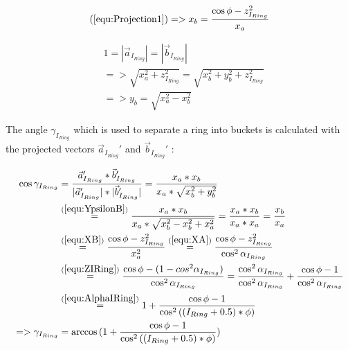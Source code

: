 \documentclass[../ClassicThesis.tex]{subfiles}
\begin{document}
\begin{equation}
    \label{equ:XB}
   (\ref{equ:Projection1}) => x_{b} = \frac{ \cos{\phi} - z_{I_{Ring}}^{2} }{ x_{a} }
\end{equation}

\begin{equation}
\begin{split}
    \label{equ:YpsilonB}
    & 1 = |\vec{a}_{I_{Ring}}| = |\vec{b}_{I_{Ring}}| \\
    & => \sqrt{ x_{a}^{2} + z_{I_{Ring}}^{2} } = \sqrt{ x_{b}^{2} + y_{b}^{2} + z_{I_{Ring}}^{2} } \\
    & => y_{b} = \sqrt{ x_{a}^{2} - x_{b}^{2} }
\end{split}
\end{equation}


The angle ${\gamma}_{I_{Ring}}$ which is used to separate a ring into buckets is calculated with the projected vectors $ \vec{a}_{I_{Ring}}' $ and $ \vec{b}_{I_{Ring}}' $ :

\begin{equation}
\begin{split}
    \cos{{\gamma}_{I_{Ring}}}& = \frac{\vec{a}_{I_{Ring}}' * \vec{b}_{I_{Ring}}'}{|\vec{a}_{I_{Ring}}'| * |\vec{b}_{I_{Ring}}'|}
    = \frac{ x_{a} * x_{b} }{ x_{a} * \sqrt{  x_{b}^{2} +  y_{b}^{2} } } \\
    & \stackrel{(\ref{equ:YpsilonB})}{=} \frac{ x_{a} * x_{b} }{ x_{a} * \sqrt{  x_{b}^{2} - x_{b}^{2} +  x_{a}^{2} } }
    = \frac{ x_{a} * x_{b} }{ x_{a} * x_{a} }
    = \frac{ x_{b} }{ x_{a} } \\
    & \stackrel{(\ref{equ:XB})}{=} \frac{ \cos{\phi} - z_{I_{Ring}}^{2} }{ x_{a}^{2} }
    \stackrel{(\ref{equ:XA})}{=} \frac{ \cos{\phi} - z_{I_{Ring}}^{2} }{ \cos^{2}{{\alpha}_{I_{Ring}}} } \\
    & \stackrel{(\ref{equ:ZIRing})}{=} \frac{ \cos{\phi} - ( 1 - cos^{2}{{\alpha}_{I_{Ring}}} ) }{ \cos^{2}{{\alpha}_{I_{Ring}}} }
    = \frac{ \cos^{2}{{\alpha}_{I_{Ring}}} }{ \cos^{2}{{\alpha}_{I_{Ring}}} } + \frac{ \cos{\phi} - 1 }{ \cos^{2}{{\alpha}_{I_{Ring}}} } \\
    & \stackrel{(\ref{equ:AlphaIRing})}{=} 1 + \frac{ \cos{\phi} - 1 }{ \cos^{2}{( (I_{Ring} + 0.5) * \phi )} } \\
    => {\gamma}_{I_{Ring}} & = \arccos{( 1 + \frac{ \cos{\phi} - 1 }{ \cos^{2}{( (I_{Ring} + 0.5) * \phi )} } )}
\end{split}
\end{equation}
\end{document}
